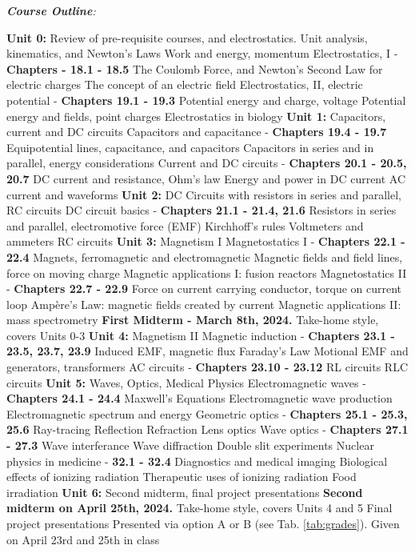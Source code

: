 \documentclass[10pt]{article}
\begin{document}
\clearpage
\twocolumn
\textit{\textbf{Course Outline}:}
\begin{outline}[enumerate]
\1 \textbf{Unit 0:} Review of pre-requisite courses, and electrostatics.
\2 Unit analysis, kinematics, and Newton's Laws
\2 Work and energy, momentum
\2 Electrostatics, I - \textbf{Chapters - 18.1 - 18.5}
\3 The Coulomb Force, and Newton's Second Law for electric charges
\3 The concept of an electric field
\2 Electrostatics, II, electric potential - \textbf{Chapters 19.1 - 19.3}
\3 Potential energy and charge, voltage
\3 Potential energy and fields, point charges
\3 Electrostatics in biology
\1 \textbf{Unit 1:} Capacitors, current and DC circuits
\2 Capacitors and capacitance - \textbf{Chapters 19.4 - 19.7}
\3 Equipotential lines, capacitance, and capacitors
\3 Capacitors in series and in parallel, energy considerations
\2 Current and DC circuits - \textbf{Chapters 20.1 - 20.5, 20.7}
\3 DC current and resistance, Ohm's law
\3 Energy and power in DC current
\3 AC current and waveforms
\1 \textbf{Unit 2:} DC Circuits with resistors in series and parallel, RC circuits
\2 DC circuit basics - \textbf{Chapters 21.1 - 21.4, 21.6}
\3 Resistors in series and parallel, electromotive force (EMF)
\3 Kirchhoff's rules
\3 Voltmeters and ammeters
\3 RC circuits
\1 \textbf{Unit 3:} Magnetism I
\2 Magnetostatics I - \textbf{Chapters 22.1 - 22.4}
\3 Magnets, ferromagnetic and electromagnetic
\3 Magnetic fields and field lines, force on moving charge
\3 Magnetic applications I: fusion reactors
\2 Magnetostatics II - \textbf{Chapters 22.7 - 22.9}
\3 Force on current carrying conductor, torque on current loop
\3 Amp\`{e}re's Law: magnetic fields created by current
\3 Magnetic applications II: mass spectrometry
\1 \textbf{First Midterm - March 8th, 2024.}
\2 Take-home style, covers Units 0-3
\1 \textbf{Unit 4:} Magnetism II
\2 Magnetic induction - \textbf{Chapters 23.1 - 23.5, 23.7, 23.9}
\3 Induced EMF, magnetic flux
\3 Faraday's Law
\3 Motional EMF and generators, transformers
\2 AC circuits - \textbf{Chapters 23.10 - 23.12}
\3 RL circuits
\3 RLC circuits
\1 \textbf{Unit 5:} Waves, Optics, Medical Physics
\2 Electromagnetic waves - \textbf{Chapters 24.1 - 24.4}
\3 Maxwell's Equations
\3 Electromagnetic wave production
\3 Electromagnetic spectrum and energy
\2 Geometric optics - \textbf{Chapters 25.1 - 25.3, 25.6}
\3 Ray-tracing
\3 Reflection
\3 Refraction
\3 Lens optics
\2 Wave optics - \textbf{Chapters 27.1 - 27.3}
\3 Wave interferance
\3 Wave diffraction
\3 Double slit experiments
\2 Nuclear physics in medicine - \textbf{32.1 - 32.4}
\3 Diagnostics and medical imaging
\3 Biological effects of ionizing radiation
\3 Therapeutic uses of ionizing radiation
\3 Food irradiation
\1 \textbf{Unit 6:} Second midterm, final project presentations
\2 \textbf{Second midterm on April 25th, 2024.}
\3 Take-home style, covers Units 4 and 5
\2 Final project presentations
\3 Presented via option A or B (see Tab. \ref{tab:grades}).
\3 Given on April 23rd and 25th in class
\end{outline}
\end{document}
